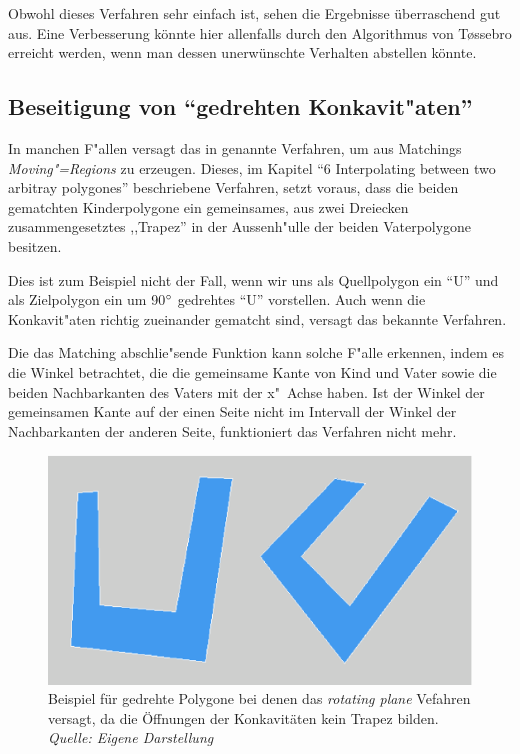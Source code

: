Obwohl dieses Verfahren sehr einfach ist, sehen die Ergebnisse überraschend gut aus. Eine Verbesserung könnte hier allenfalls durch den Algorithmus von T\o{}ssebro erreicht werden, wenn man dessen unerwünschte Verhalten abstellen könnte.

\subsection{Beseitigung von "`gedrehten Konkavit"aten"'}\label{gedrehtKon}
In manchen F"allen versagt das in \cite{TG} genannte Verfahren, um aus Matchings \textit{Moving"=Regions} zu erzeugen. Dieses, im Kapitel "`6 Interpolating between two arbitray polygones"' beschriebene Verfahren, setzt voraus, dass die beiden gematchten Kinderpolygone ein gemeinsames, aus zwei Dreiecken zusammengesetztes ,,Trapez'' in der Aussenh"ulle der beiden Vaterpolygone besitzen. 

Dies ist zum Beispiel nicht der Fall, wenn wir uns als Quellpolygon ein "`U"' und als Zielpolygon ein um 90$\degree$ gedrehtes "`U"' vorstellen. Auch wenn die Konkavit"aten richtig zueinander gematcht sind, versagt das bekannte Verfahren.

Die das Matching abschlie"sende Funktion kann solche F"alle erkennen, indem es die Winkel betrachtet, die die gemeinsame Kante von Kind und Vater sowie die beiden Nachbarkanten des Vaters mit der x"~Achse haben. Ist der Winkel der gemeinsamen Kante auf der einen Seite nicht im  Intervall der Winkel der Nachbarkanten der anderen Seite, funktioniert das Verfahren nicht mehr.

\begin{figure}
	\centering
	\includegraphics[width=.8 \textwidth]{dreh1.eps}
	\caption[Beispiel für gedrehte Polygone]{Beispiel für gedrehte Polygone bei denen das \textit{rotating plane} Vefahren versagt, da die Öffnungen der Konkavitäten kein Trapez bilden.\\\textit{Quelle: Eigene Darstellung}}
	\label{fig:gedrehteMatches}
\end{figure}


